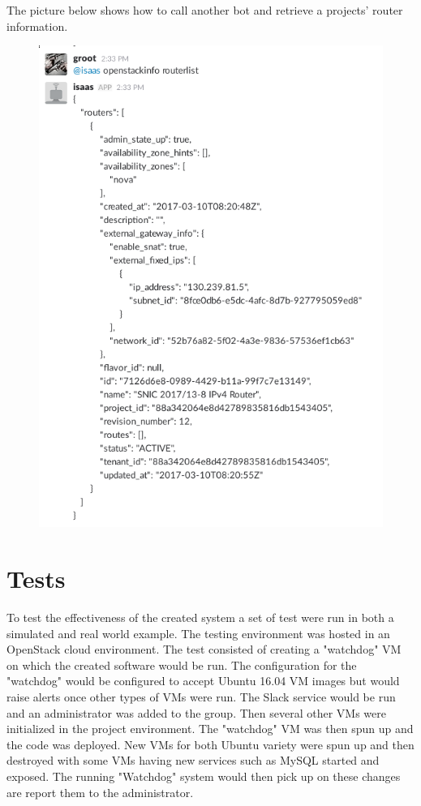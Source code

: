 \documentclass[12pt]{article}
\begin{document}
\newpage
The picture below shows how to call another bot and retrieve a projects' router information.
\begin{figure}[H]
    \begin{mdframed}
    \includegraphics[scale=.5]{./pic/2017-06-26-113808_563x789_scrot.png}
    \end{mdframed}
\end{figure}

\section{Tests}
To test the effectiveness of the created system a set of test were run in both a simulated and real world example. The testing environment was hosted in an OpenStack cloud environment. The test consisted of creating a "watchdog" VM on which the created software would be run. The configuration for the "watchdog" would be configured to accept Ubuntu 16.04 VM images but would raise alerts once other types of VMs were run. The Slack service would be run and an administrator was added to the group. Then several other VMs were initialized in the project environment. The "watchdog" VM was then spun up and the code was deployed. New VMs for both Ubuntu variety were spun up and then destroyed with some VMs having new services such as MySQL started and exposed. The running "Watchdog" system would then pick up on these changes are report them to the administrator.
\end{document}
